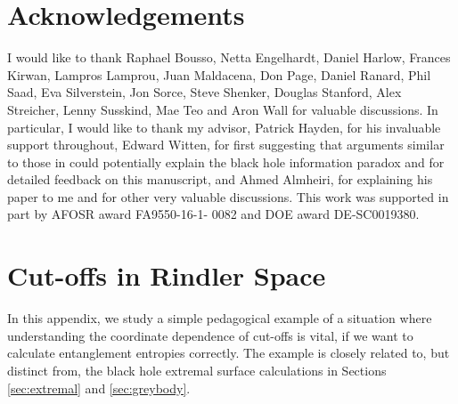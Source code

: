 \documentclass[12pt]{article}
\begin{document}
\section{Acknowledgements}
I would like to thank Raphael Bousso, Netta Engelhardt, Daniel Harlow, Frances Kirwan, Lampros Lamprou, Juan Maldacena, Don Page, Daniel Ranard, Phil Saad, Eva Silverstein, Jon Sorce, Steve Shenker, Douglas Stanford, Alex Streicher, Lenny Susskind, Mae Teo and Aron Wall for valuable discussions. In particular, I would like to thank my advisor, Patrick Hayden, for his invaluable support throughout, Edward Witten, for first suggesting that arguments similar to those in \cite{hayden2018learning} could potentially explain the black hole information paradox and for detailed feedback on this manuscript, and Ahmed Almheiri, for explaining his paper \cite{almheiri2018holographic} to me and for other very valuable discussions. This work was supported in part by AFOSR award FA9550-16-1- 0082 and DOE award {DE-SC0019380}.

\appendix

\section{Cut-offs in Rindler Space} \label{app:rindler}
In this appendix, we study a simple pedagogical example of a situation where understanding the coordinate dependence of cut-offs is vital, if we want to calculate entanglement entropies correctly. The example is closely related to, but distinct from, the black hole extremal surface calculations in Sections \ref{sec:extremal} and \ref{sec:greybody}.
\end{document}
